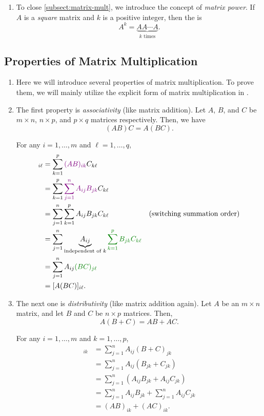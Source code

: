 \begin{enumerate}
\item To close \cref{subsect:matrix-mult}, we introduce the concept of
\emph{matrix power}.  If \(A\) is a \emph{square} matrix and \(k\) is a
positive integer, then the  is
\[
A^k=\underbrace{AA\cdots A}_{\text{\(k\) times}}.
\]
\end{enumerate}
\subsection{Properties of Matrix Multiplication}
\label{subsect:matrix-mult-prop}
\begin{enumerate}
\item Here we will introduce several properties of matrix multiplication. To
prove them, we will mainly utilize the explicit form of matrix
multiplication in .

\item \label{it:matrix-mult-asso}
The first property is \emph{associativity} (like matrix addition). Let
\(A\), \(B\), and \(C\) be \(m\times n\), \(n\times p\), and \(p\times q\)
matrices respectively. Then, we have
\[
(AB)C=A(BC).
\]
\begin{pf}
For any \(i=1,\dotsc,m\) and \(\ell=1,\dotsc,q\),
\begin{align*}
[(AB)C]_{i\ell }&=\sum_{k=1}^{p}\vc{(AB)_{ik}}C_{k\ell}\\
&=\sum_{k=1}^{p}\vc{\sum_{j=1}^{n}A_{ij}B_{jk}}C_{k\ell}\\
&=\sum_{j=1}^{n}\sum_{k=1}^{p}A_{ij}B_{jk}C_{k\ell}&\text{(switching summation order)}\\
&=\sum_{j=1}^{n}\underbrace{A_{ij}}_{\text{independent of \(k\)}}\gc{\sum_{k=1}^{p}B_{jk}C_{k\ell}}\\
&=\sum_{j=1}^{n}A_{ij}\gc{(BC)_{j\ell}}\\
&=[A(BC)]_{i\ell}.
\end{align*}
\end{pf}

\item \label{it:matrix-mult-dist}
The next one is \emph{distributivity} (like matrix addition again). Let \(A\)
be an \(m\times n\) matrix, and let \(B\) and \(C\) be \(n\times p\) matrices.
Then,
\[
A(B+C)=AB+AC.
\]
\begin{pf}
For any \(i=1,\dotsc,m\) and \(k=1,\dotsc,p\),
\begin{align*}
[A(B+C)]_{ik}&=\sum_{j=1}^{n}A_{ij}(B+C)_{jk}\\
&=\sum_{j=1}^{n}A_{ij}(B_{jk}+C_{jk})\\
&=\sum_{j=1}^{n}(A_{ij}B_{jk}+A_{ij}C_{jk})\\
&=\sum_{j=1}^{n}A_{ij}B_{jk}+\sum_{j=1}^{n}A_{ij}C_{jk}\\
&=(AB)_{ik}+(AC)_{ik}.
\end{align*}
\end{pf}


\end{enumerate}
